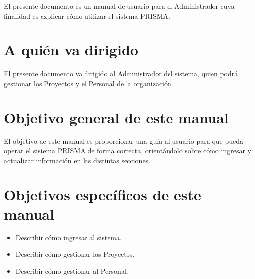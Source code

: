 El presente documento es un manual de usuario para el Administrador cuya finalidad es explicar cómo utilizar el sistema PRISMA.\\

\section{A quién va dirigido}

El presente documento va dirigido al Administrador del sistema, quien podrá gestionar los Proyectos y el Personal de la organización.\\


\section{Objetivo general de este manual}
\label{sec:ObjetivoGeneralManual}

El objetivo de este manual es proporcionar una guía al usuario para que pueda operar el sistema PRISMA de forma correcta, orientándolo sobre cómo ingresar y 
actualizar información en las distintas secciones.\\


\section{Objetivos específicos de este manual}

\begin{itemize}
	\item Describir cómo ingresar al sistema.
	\item Describir cómo gestionar los Proyectos.
	\item Describir cómo gestionar al Personal.
\end{itemize}
